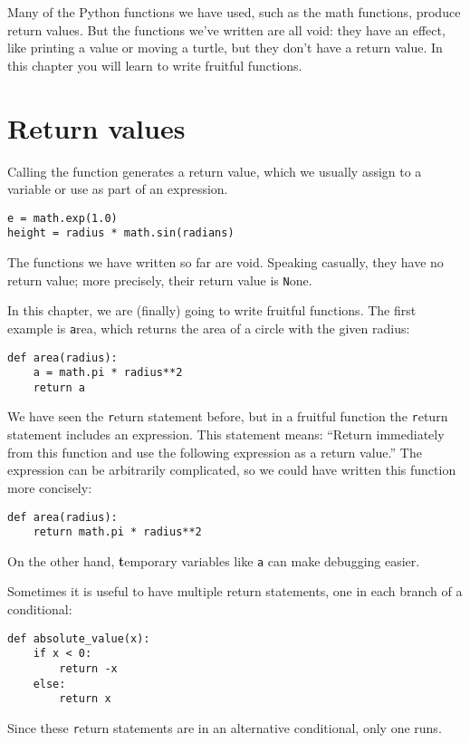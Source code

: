 \documentclass[
DIV=11,
fontsize=13,
twoside,
headinclude=false,
titlepage=firstiscover,
abstract=true,
headsepline=true,
footsepline=true,
chapterprefix=true, %
headings=big,
bibliography=totoc,%
captions=tableheading
]{scrbook}
\theoremstyle{definition}
\begin{document}
Many of the Python functions we have used, such as the math
functions, produce return values.  But the functions we've written
are all void: they have an effect, like printing a value
or moving a turtle, but they don't have a return value.  In
this chapter you will learn to write fruitful functions.


\section{Return values}

Calling the function generates a return
value, which we usually assign to a variable or use as part of an
expression.

\begin{lstlisting}
e = math.exp(1.0)
height = radius * math.sin(radians)
\end{lstlisting}
%
The functions we have written so far are void.  Speaking casually,
they have no return value; more precisely,
their return value is {\texttt None}.

In this chapter, we are (finally) going to write fruitful functions.
The first example is {\texttt area}, which returns the area of a circle
with the given radius:

\begin{lstlisting}
def area(radius):
    a = math.pi * radius**2
    return a
\end{lstlisting}
%
We have seen the {\texttt return} statement before, but in a fruitful
function the {\texttt return} statement includes
an expression.  This statement means: ``Return immediately from
this function and use the following expression as a return value.''
The expression can be arbitrarily complicated, so we could
have written this function more concisely:

\begin{lstlisting}
def area(radius):
    return math.pi * radius**2
\end{lstlisting}
%
On the other hand, {\textbf temporary variables} like {\texttt a} can make
debugging easier.

Sometimes it is useful to have multiple return statements, one in each
branch of a conditional:

\begin{lstlisting}
def absolute_value(x):
    if x < 0:
        return -x
    else:
        return x
\end{lstlisting}
%
Since these {\texttt return} statements are in an alternative conditional,
only one runs.
\end{document}
